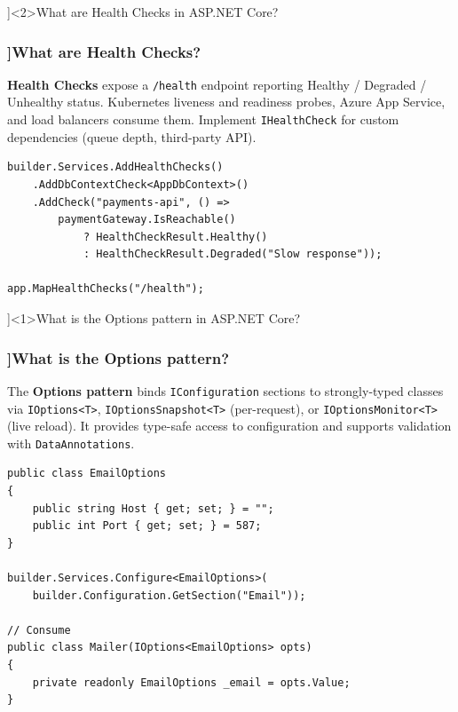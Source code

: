 \QuestionSlide[\CategoryBadge[AspNetColor!20]{ASP.NET Core}]<2>{What are Health Checks in ASP.NET Core?}

\begin{frame}[fragile]
  \frametitle{\AnswerTitle[\CategoryBadge[AspNetColor!20]{ASP.NET Core}]{What are Health Checks?}}

  {\footnotesize
  \textbf{Health Checks} expose a \texttt{/health} endpoint reporting Healthy / Degraded / Unhealthy status. Kubernetes liveness and readiness probes, Azure App Service, and load balancers consume them. Implement \texttt{IHealthCheck} for custom dependencies (queue depth, third-party API).
  }

  \begin{verbatim}
builder.Services.AddHealthChecks()
    .AddDbContextCheck<AppDbContext>()
    .AddCheck("payments-api", () =>
        paymentGateway.IsReachable()
            ? HealthCheckResult.Healthy()
            : HealthCheckResult.Degraded("Slow response"));

app.MapHealthChecks("/health");
  \end{verbatim}
\end{frame}

\QuestionSlide[\CategoryBadge[AspNetColor!20]{ASP.NET Core}]<1>{What is the Options pattern in ASP.NET Core?}

\begin{frame}[fragile]
  \frametitle{\AnswerTitle[\CategoryBadge[AspNetColor!20]{ASP.NET Core}]{What is the Options pattern?}}

  {\footnotesize
  The \textbf{Options pattern} binds \texttt{IConfiguration} sections to strongly-typed classes via \texttt{IOptions<T>}, \texttt{IOptionsSnapshot<T>} (per-request), or \texttt{IOptionsMonitor<T>} (live reload). It provides type-safe access to configuration and supports validation with \texttt{DataAnnotations}.
  }

  \begin{verbatim}
public class EmailOptions
{
    public string Host { get; set; } = "";
    public int Port { get; set; } = 587;
}

builder.Services.Configure<EmailOptions>(
    builder.Configuration.GetSection("Email"));

// Consume
public class Mailer(IOptions<EmailOptions> opts)
{
    private readonly EmailOptions _email = opts.Value;
}
  \end{verbatim}
\end{frame}

